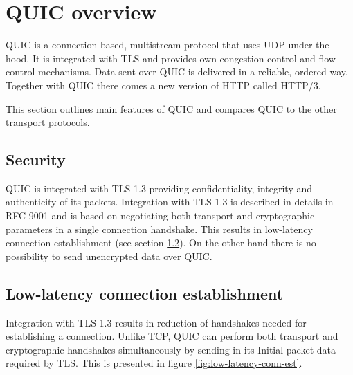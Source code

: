 \section{QUIC overview}
QUIC is a connection-based, multistream protocol that uses UDP under the hood. 
It is integrated with TLS and provides own congestion control and flow control mechanisms.
Data sent over QUIC is delivered in a reliable, ordered way.
Together with QUIC there comes a new version of HTTP called HTTP/3.

This section outlines main features of QUIC and compares QUIC to the other transport protocols.

\subsection{Security}
QUIC is integrated with TLS 1.3 providing confidentiality, integrity and authenticity of its packets.
Integration with TLS 1.3 is described in details in RFC 9001 \cite{rfc9001} and is based on negotiating both transport and cryptographic parameters in a single connection handshake.
This results in low-latency connection establishment (see section \ref{subsec:low-latency-conn-est}).
On the other hand there is no possibility to send unencrypted data over QUIC.

\subsection{Low-latency connection establishment}
\label{subsec:low-latency-conn-est}
Integration with TLS 1.3 results in reduction of handshakes needed for establishing a connection.
Unlike TCP, QUIC can perform both transport and cryptographic handshakes simultaneously by sending in its Initial packet data required by TLS.
This is presented in figure \ref{fig:low-latency-conn-est}.

